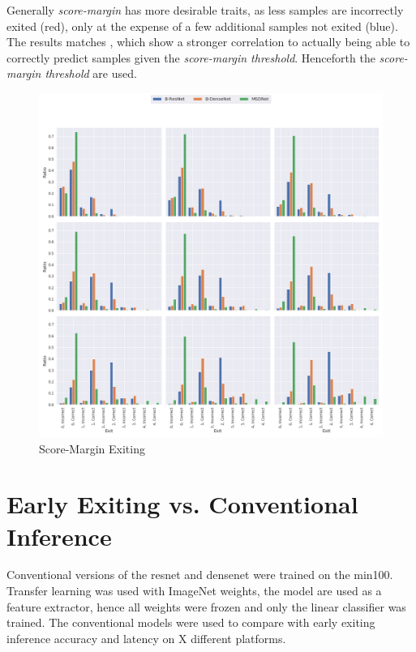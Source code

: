Generally \emph{score-margin} has more desirable traits, as less samples are incorrectly exited (red), only at the expense of a few additional samples not exited (blue). The results matches \cite{park_big/little_2015}, which show a stronger correlation to actually being able to correctly predict samples given the \emph{score-margin threshold}. Henceforth the \emph{score-margin threshold} are used.

\begin{figure}
	\centering
	\includegraphics[width=\linewidth]{figures/threshold_plots/inference_threshold_test}
	\caption{Score-Margin Exiting}
	\label{fig:inferencethresholdtest}
\end{figure}

\section{Early Exiting vs. Conventional Inference}

Conventional versions of the \gls{resnet} and \gls{densenet} were trained on the \gls{min100}. Transfer learning was used with ImageNet weights, the model are used as a feature extractor, hence all weights were frozen and only the linear classifier was trained. The conventional models were used to compare with early exiting inference accuracy and latency on X different platforms.



